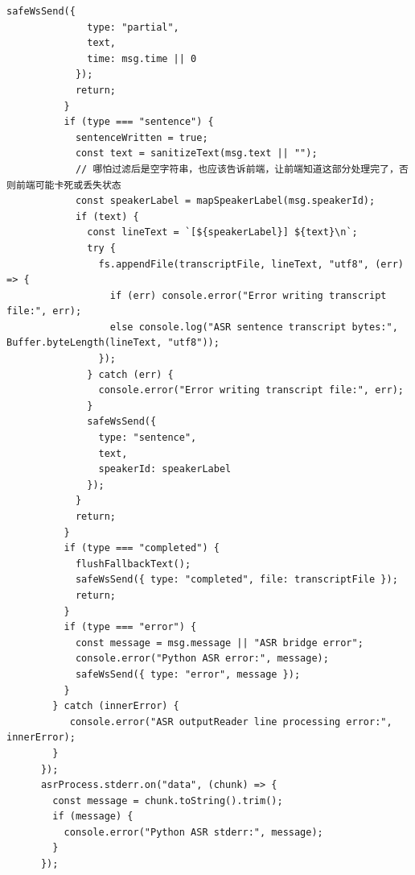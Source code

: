 \documentclass[12pt,a4paper]{article}
\begin{document}
\begin{Verbatim}[fontsize=\footnotesize]
            safeWsSend({
              type: "partial",
              text,
              time: msg.time || 0
            });
            return;
          }
          if (type === "sentence") {
            sentenceWritten = true;
            const text = sanitizeText(msg.text || "");
            // 哪怕过滤后是空字符串，也应该告诉前端，让前端知道这部分处理完了，否则前端可能卡死或丢失状态
            const speakerLabel = mapSpeakerLabel(msg.speakerId);
            if (text) {
              const lineText = `[${speakerLabel}] ${text}\n`;
              try {
                fs.appendFile(transcriptFile, lineText, "utf8", (err) => {
                  if (err) console.error("Error writing transcript file:", err);
                  else console.log("ASR sentence transcript bytes:", Buffer.byteLength(lineText, "utf8"));
                });
              } catch (err) {
                console.error("Error writing transcript file:", err);
              }
              safeWsSend({
                type: "sentence",
                text,
                speakerId: speakerLabel
              });
            }
            return;
          }
          if (type === "completed") {
            flushFallbackText();
            safeWsSend({ type: "completed", file: transcriptFile });
            return;
          }
          if (type === "error") {
            const message = msg.message || "ASR bridge error";
            console.error("Python ASR error:", message);
            safeWsSend({ type: "error", message });
          }
        } catch (innerError) {
           console.error("ASR outputReader line processing error:", innerError);
        }
      });
      asrProcess.stderr.on("data", (chunk) => {
        const message = chunk.toString().trim();
        if (message) {
          console.error("Python ASR stderr:", message);
        }
      });
\end{Verbatim}
\newpage
{}
\fancyhead[R]{}
\end{document}
